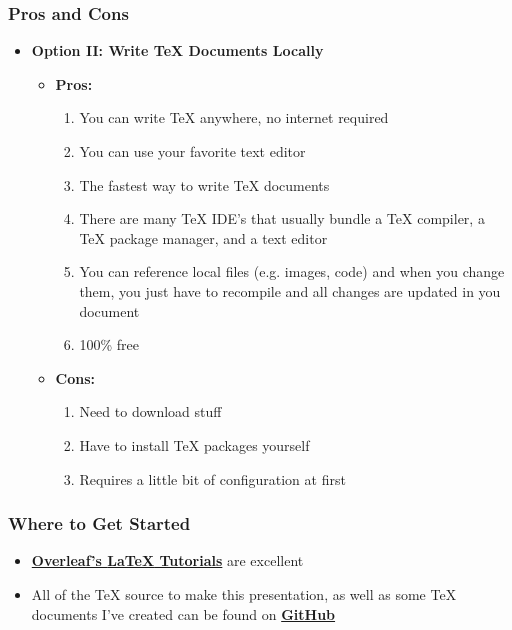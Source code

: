 \documentclass{beamer}
\begin{document}
\begin{frame}
  \frametitle{Pros and Cons}
  \begin{itemize}
    \item \textbf{Option II: Write {\TeX} Documents Locally}
      \begin{itemize}
        \item \textbf{Pros:}
          \begin{enumerate}
            \item You can write {\TeX} anywhere, no internet required
            \item You can use your favorite text editor
            \item The fastest way to write {\TeX} documents
            \item There are many {\TeX} IDE's that usually bundle a {\TeX}
              compiler, a {\TeX} package manager, and a text editor
            \item You can reference local files (e.g. images, code) and when you
              change them, you just have to recompile and all changes are
              updated in you document
            \item 100\% free
          \end{enumerate}
        \item \textbf{Cons:}
          \begin{enumerate}
            \item Need to download stuff
            \item Have to install {\TeX} packages yourself
            \item Requires a little bit of configuration at first
          \end{enumerate}
      \end{itemize}
  \end{itemize}
\end{frame}

\begin{frame}
  \frametitle{Where to Get Started}
  \begin{itemize}
    \item
      \textbf{\href{https://www.overleaf.com/learn/latex/Main_Page}{Overleaf's
          {\LaTeX} Tutorials}} are excellent
    \item All of the {\TeX} source to make this presentation, as well as some
      {\TeX} documents I've created can be found on
      \textbf{\href{https://github.com/JOHNeMac36/tex_workshop}{GitHub}}
  \end{itemize}
\end{frame}
\end{document}

